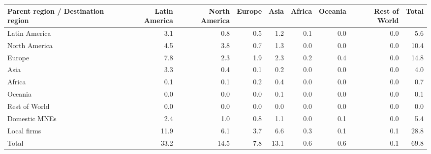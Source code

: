 \begin{tabular}{lrrrrrrrr}
\toprule
Parent region / Destination region & Latin America & North America & Europe & Asia & Africa & Oceania & Rest of World & Total \\
\midrule
Latin America & 3.1 & 0.8 & 0.5 & 1.2 & 0.1 & 0.0 & 0.0 & 5.6 \\
North America & 4.5 & 3.8 & 0.7 & 1.3 & 0.0 & 0.0 & 0.0 & 10.4 \\
Europe & 7.8 & 2.3 & 1.9 & 2.3 & 0.2 & 0.4 & 0.0 & 14.8 \\
Asia & 3.3 & 0.4 & 0.1 & 0.2 & 0.0 & 0.0 & 0.0 & 4.0 \\
Africa & 0.1 & 0.1 & 0.2 & 0.4 & 0.0 & 0.0 & 0.0 & 0.7 \\
Oceania & 0.0 & 0.0 & 0.0 & 0.1 & 0.0 & 0.0 & 0.0 & 0.1 \\
Rest of World & 0.0 & 0.0 & 0.0 & 0.0 & 0.0 & 0.0 & 0.0 & 0.0 \\
Domestic MNEs & 2.4 & 1.0 & 0.8 & 1.1 & 0.0 & 0.1 & 0.0 & 5.4 \\
Local firms & 11.9 & 6.1 & 3.7 & 6.6 & 0.3 & 0.1 & 0.1 & 28.8 \\
\midrule
Total & 33.2 & 14.5 & 7.8 & 13.1 & 0.6 & 0.6 & 0.1 & 69.8 \\
\bottomrule
\end{tabular}
